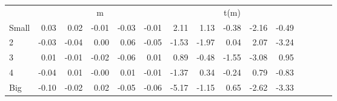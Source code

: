 \begin{table}[!ht]
\begin{tabular}{lrrrrrrrrrrrrrr}
      & \multicolumn{5}{c}{m} & \multicolumn{5}{c}{t(m)}
    
    \\
      \cmidrule(r){2-6} \cmidrule(r){7-11}

    Small   & 0.03  & 0.02  & -0.01  & -0.03  & -0.01  & 2.11  & 1.13  & -0.38  & -2.16  & -0.49  \\
         2  & -0.03  & -0.04  & 0.00  & 0.06  & -0.05  & -1.53  & -1.97  & 0.04  & 2.07  & -3.24  \\
         3  & 0.01  & -0.01  & -0.02  & -0.06  & 0.01  & 0.89  & -0.48  & -1.55  & -3.08  & 0.95  \\
         4  & -0.04  & 0.01  & -0.00  & 0.01  & -0.01  & -1.37  & 0.34  & -0.24  & 0.79  & -0.83  \\
    Big     & -0.10  & -0.02  & 0.02  & -0.05  & -0.06  & -5.17  & -1.15  & 0.65  & -2.62  & -3.33  \\

  

  \bottomrule
\end{tabular}
\label{tbl:25_Size_NI_C97}
\end{table}